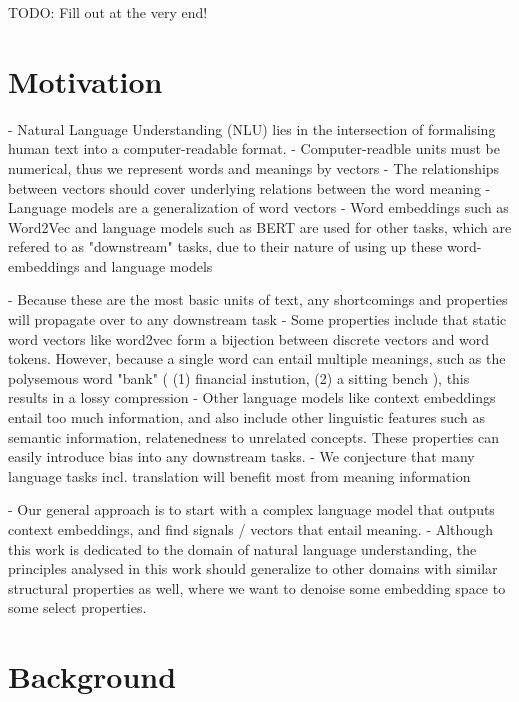 \documentclass[a4paper,12pt,twoside,openright]{report}
\begin{document}
TODO: Fill out at the very end!

\newpage
\chapter{Motivation}
 
- Natural Language Understanding (NLU) lies in the intersection of formalising human text into a computer-readable format.
- Computer-readble units must be numerical, thus we represent words and meanings by vectors
- The relationships between vectors should cover underlying relations between the word meaning
- Language models are a generalization of word vectors
- Word embeddings such as Word2Vec and language models such as BERT are used for other tasks, which are refered to as "downstream" tasks, due to their nature of using up these word-embeddings and language models

- Because these are the most basic units of text, any shortcomings and properties will propagate over to any downstream task
- Some properties include that static word vectors like word2vec form a bijection between discrete vectors and word tokens. 
However, because a single word can entail multiple meanings, such as the polysemous word "bank" ( (1) financial instution, (2) a sitting bench ), this results in a lossy compression
- Other language models like context embeddings entail too much information, and also include other linguistic features such as semantic information, relatenedness to unrelated concepts.
These properties can easily introduce bias into any downstream tasks.
- We conjecture that many language tasks incl. translation will benefit most from meaning information

- Our general approach is to start with a complex language model that outputs context embeddings, and find signals / vectors that entail meaning.
- Although this work is dedicated to the domain of natural language understanding, the principles analysed in this work should generalize to other domains with similar structural properties as well, where we want to denoise some embedding space to some select properties.


\chapter{Background} 
\end{document}
